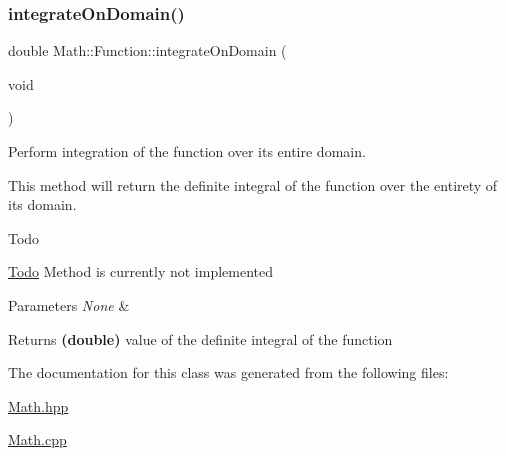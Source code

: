 \subsubsection{\texorpdfstring{integrate\+On\+Domain()}{integrateOnDomain()}}
{\footnotesize\ttfamily double Math\+::\+Function\+::integrate\+On\+Domain (\begin{DoxyParamCaption}\item[{void}]{ }\end{DoxyParamCaption})}



Perform integration of the function over its entire domain. 

This method will return the definite integral of the function over the entirety of its domain. \begin{DoxyRefDesc}{Todo}
\item[\mbox{\hyperlink{todo__todo000004}{Todo}}]Method is currently not implemented \end{DoxyRefDesc}

\begin{DoxyParams}{Parameters}
{\em None} & \\
\hline
\end{DoxyParams}
\begin{DoxyReturn}{Returns}
{\bfseries (double)} value of the definite integral of the function 
\end{DoxyReturn}


The documentation for this class was generated from the following files\+:\begin{DoxyCompactItemize}
\item 
\mbox{\hyperlink{_math_8hpp}{Math.\+hpp}}\item 
\mbox{\hyperlink{_math_8cpp}{Math.\+cpp}}\end{DoxyCompactItemize}
